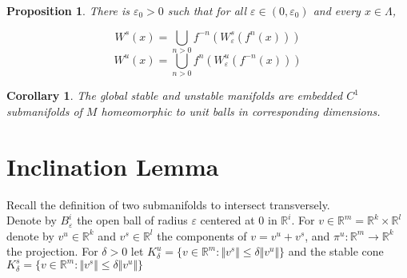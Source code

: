 \documentclass{article}
\newtheorem{prop}{Proposition}
\newtheorem{cor}{Corollary}
\begin{document}
\begin{prop}

There is $\varepsilon_0 > 0$ such that for all $\varepsilon \in (0, \varepsilon_0)$ and every $x \in \Lambda$,

\[W^s(x) = \bigcup_{n > 0} f^{-n}(W^s_{\varepsilon}(f^n(x)))\]
\[W^u(x) = \bigcup_{n > 0}f^n(W^u_{\varepsilon}(f^{-n}(x)))\]

\end{prop}

\begin{cor}

The global stable and unstable manifolds are embedded $C^1$ submanifolds of $M$ homeomorphic to unit balls in corresponding dimensions.

\end{cor}


\section{Inclination Lemma}

\indent Recall the definition of two submanifolds to intersect transversely. \\
\indent Denote by $B^i_{\varepsilon}$ the open ball of radius $\varepsilon$ centered at 0 in $\mathbb{R}^i$. For $v \in \mathbb{R}^m=\mathbb{R}^k \times \mathbb{R}^l$ denote by $v^u \in \mathbb{R}^k$ and $v^s \in \mathbb{R}^l$ the components of $v = v^u + v^s$, and $\pi^u: \mathbb{R}^m \to \mathbb{R}^k$ the projection. For $\delta > 0$ let $K^u_{\delta} = \{ v \in \mathbb{R}^m: \Vert v^s \Vert \leq \delta \Vert v^u \Vert \}$ and the stable cone $K^s_{\delta} = \{ v \in \mathbb{R}^m: \Vert v^s \Vert \leq \delta \Vert v^u \Vert \} $
\end{document}
